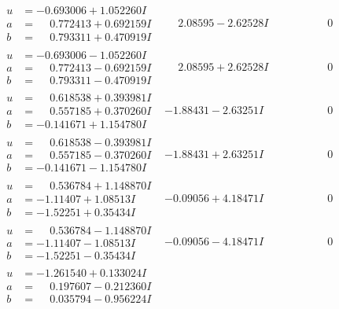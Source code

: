 \documentclass[1p]{elsarticle_modified}
\theoremstyle{definition}
\begin{document}
$$\begin{array}{c|c|c}
 \hline 
\begin{aligned}
u &= -0.693006 + 1.052260 I \\
a &= \phantom{-}0.772413 + 0.692159 I \\
b &= \phantom{-}0.793311 + 0.470919 I\end{aligned}
 & \phantom{-}2.08595 - 2.62528 I & \phantom{-0.000000 } 0 \\ \hline\begin{aligned}
u &= -0.693006 - 1.052260 I \\
a &= \phantom{-}0.772413 - 0.692159 I \\
b &= \phantom{-}0.793311 - 0.470919 I\end{aligned}
 & \phantom{-}2.08595 + 2.62528 I & \phantom{-0.000000 } 0 \\ \hline\begin{aligned}
u &= \phantom{-}0.618538 + 0.393981 I \\
a &= \phantom{-}0.557185 + 0.370260 I \\
b &= -0.141671 + 1.154780 I\end{aligned}
 & -1.88431 - 2.63251 I & \phantom{-0.000000 } 0 \\ \hline\begin{aligned}
u &= \phantom{-}0.618538 - 0.393981 I \\
a &= \phantom{-}0.557185 - 0.370260 I \\
b &= -0.141671 - 1.154780 I\end{aligned}
 & -1.88431 + 2.63251 I & \phantom{-0.000000 } 0 \\ \hline\begin{aligned}
u &= \phantom{-}0.536784 + 1.148870 I \\
a &= -1.11407 + 1.08513 I \\
b &= -1.52251 + 0.35434 I\end{aligned}
 & -0.09056 + 4.18471 I & \phantom{-0.000000 } 0 \\ \hline\begin{aligned}
u &= \phantom{-}0.536784 - 1.148870 I \\
a &= -1.11407 - 1.08513 I \\
b &= -1.52251 - 0.35434 I\end{aligned}
 & -0.09056 - 4.18471 I & \phantom{-0.000000 } 0 \\ \hline\begin{aligned}
u &= -1.261540 + 0.133024 I \\
a &= \phantom{-}0.197607 - 0.212360 I \\
b &= \phantom{-}0.035794 - 0.956224 I\end{aligned}

\end{array}$$
\end{document}
